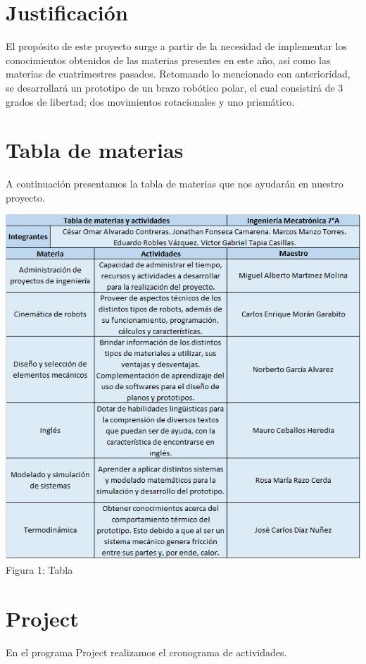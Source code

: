 \documentclass[12pt,a4paper]{report}
\begin{document}
\section{Justificación}
El propósito de este proyecto surge a partir de la necesidad de implementar los conocimientos obtenidos de las materias presentes en este año, así como las materias de cuatrimestres pasados.
Retomando lo mencionado con anterioridad, se desarrollará un prototipo de un brazo robótico polar, el cual consistirá de 3 grados de libertad; dos movimientos rotacionales y uno prismático.

\section{Tabla de materias}
A continuación presentamos la tabla de materias que nos ayudarán en nuestro proyecto.\\
\begin{center}
\includegraphics[width=16cm]{tabla.png}
 Figura 1: Tabla 
\end{center}



\section{Project}
En el programa Project realizamos el cronograma de actividades.\\
\end{document}
